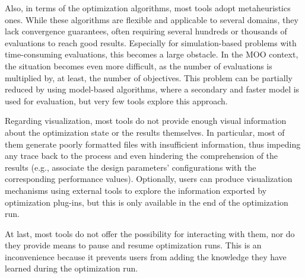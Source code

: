 	Also, in terms of the optimization algorithms, most tools adopt metaheuristics ones. While these algorithms are flexible and applicable to several domains, they lack convergence guarantees, often requiring several hundreds or thousands of evaluations to reach good results. Especially for simulation-based problems with time-consuming evaluations, this becomes a large obstacle. In the \ac{MOO} context, the situation becomes even more difficult, as the number of evaluations is multiplied by, at least, the number of objectives. This problem can be partially reduced by using model-based algorithms, where a secondary and faster model is used for evaluation, but very few tools explore this approach.
	
	Regarding visualization, most tools do not provide enough visual information about the optimization state or the results themselves. In particular, most of them generate poorly formatted files with insufficient information, thus impeding any trace back to the process and even hindering the comprehension of the results (e.g., associate the design parameters' configurations with the corresponding performance values). Optionally, users can produce visualization mechanisms using external tools to explore the information exported by optimization plug-ins, but this is only available in the end of the optimization run.
	
	At last, most tools do not offer the possibility for interacting with them, nor do they provide means to pause and resume optimization runs. This is an inconvenience because it prevents users from adding the knowledge they have learned during the optimization run.%
	
		
